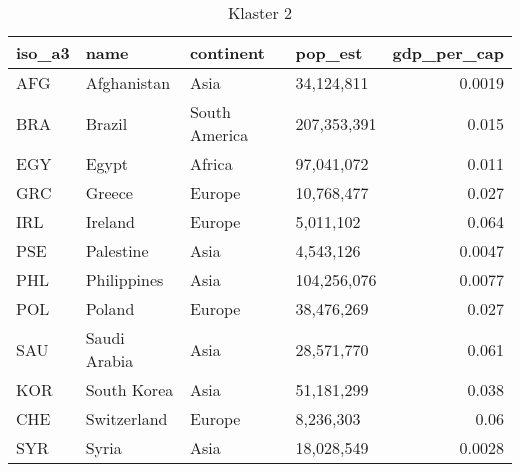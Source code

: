 \begin{table}
    \centering
    \caption{Klaster 2}
    \label{tab:cl2}
    \begin{tabular}{llllr}
        \toprule
        iso\_a3 & name         & continent     & pop\_est    & gdp\_per\_cap \\
        \midrule
        AFG     & Afghanistan  & Asia          & 34,124,811  & 0.0019        \\
        BRA     & Brazil       & South America & 207,353,391 & 0.015         \\
        EGY     & Egypt        & Africa        & 97,041,072  & 0.011         \\
        GRC     & Greece       & Europe        & 10,768,477  & 0.027         \\
        IRL     & Ireland      & Europe        & 5,011,102   & 0.064         \\
        PSE     & Palestine    & Asia          & 4,543,126   & 0.0047        \\
        PHL     & Philippines  & Asia          & 104,256,076 & 0.0077        \\
        POL     & Poland       & Europe        & 38,476,269  & 0.027         \\
        SAU     & Saudi Arabia & Asia          & 28,571,770  & 0.061         \\
        KOR     & South Korea  & Asia          & 51,181,299  & 0.038         \\
        CHE     & Switzerland  & Europe        & 8,236,303   & 0.06          \\
        SYR     & Syria        & Asia          & 18,028,549  & 0.0028        \\
        \bottomrule
    \end{tabular}
\end{table}
